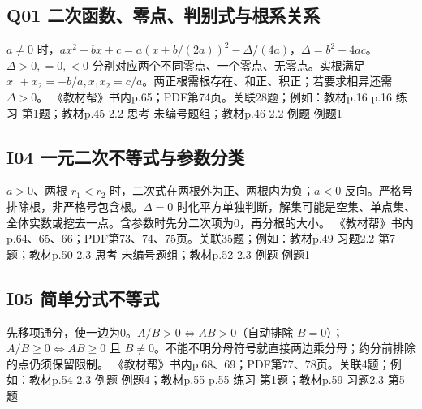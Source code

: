\par\medskip\noindent\begin{minipage}{\linewidth}\subsection{Q01 二次函数、零点、判别式与根系关系}
$a\ne0$ 时，$ax^2+bx+c=a(x+b/(2a))^2-\Delta/(4a)$，$\Delta=b^2-4ac$。$\Delta>0,=0,<0$ 分别对应两个不同零点、一个零点、无零点。实根满足 $x_1+x_2=-b/a,x_1x_2=c/a$。两正根需根存在、和正、积正；若要求相异还需 $\Delta>0$。
{\small 《教材帮》书内p.65；PDF第74页。关联28题；例如：教材p.16 p.16 练习 第1题；教材p.45 2.2 思考 未编号题组；教材p.46 2.2 例题 例题1}\par\end{minipage}\par
\par\medskip\noindent\begin{minipage}{\linewidth}\subsection{I04 一元二次不等式与参数分类}
$a>0$、两根 $r_1<r_2$ 时，二次式在两根外为正、两根内为负；$a<0$ 反向。严格号排除根，非严格号包含根。$\Delta=0$ 时化平方单独判断，解集可能是空集、单点集、全体实数或挖去一点。含参数时先分二次项为0，再分根的大小。
{\small 《教材帮》书内p.64、65、66；PDF第73、74、75页。关联35题；例如：教材p.49 习题2.2 第7题；教材p.50 2.3 思考 未编号题组；教材p.52 2.3 例题 例题1}\par\end{minipage}\par
\par\medskip\noindent\begin{minipage}{\linewidth}\subsection{I05 简单分式不等式}
先移项通分，使一边为0。$A/B>0\Leftrightarrow AB>0$（自动排除 $B=0$）；$A/B\ge0\Leftrightarrow AB\ge0$ 且 $B\ne0$。不能不明分母符号就直接两边乘分母；约分前排除的点仍须保留限制。
{\small 《教材帮》书内p.68、69；PDF第77、78页。关联4题；例如：教材p.54 2.3 例题 例题4；教材p.55 p.55 练习 第1题；教材p.59 习题2.3 第5题}\par\end{minipage}\par
